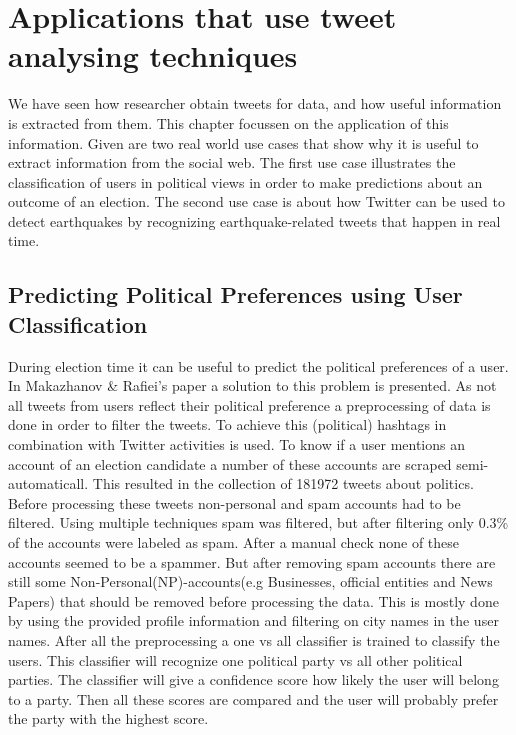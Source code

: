 \documentclass{article}
\begin{document}
\section{Applications that use tweet analysing techniques}

We have seen how researcher obtain tweets for data, and how useful information is extracted from them. This chapter focussen on the application of this information.
Given are two real world use cases that show why it is useful to extract information from the social web. The first use case illustrates the classification
of users in political views in order to make predictions about an outcome of an election. The second use case is about how Twitter can be used to detect
earthquakes by recognizing earthquake-related tweets that happen in real time.

\subsection*{Predicting Political Preferences using User Classification}

During election time it can be useful to predict the political preferences of a user. In Makazhanov \& Raﬁei's paper a solution to this problem is presented. 
As not all tweets from users reflect their political preference a preprocessing of data is done in order to filter the tweets. \cite{pol} To achieve this 
(political) hashtags in combination with Twitter activities is used. To know if a user mentions an account of an election candidate a number of these 
accounts are scraped semi-automaticall. This resulted in the collection of 181972 tweets about politics.\cite{pol}
Before processing these tweets non-personal and spam accounts had to be filtered. Using multiple techniques spam was filtered, but after filtering 
only 0.3\% of the accounts were labeled as spam. After a manual check none of these accounts seemed to be a spammer. But after removing spam accounts 
there are still some Non-Personal(NP)-accounts(e.g Businesses, official entities and News Papers)  that should be removed before processing the data. 
This is mostly done by using the provided profile information and filtering on city names in the user names.  \cite{pol}
After all the preprocessing a one vs all classifier is trained to classify the users. This classifier will recognize one political party vs all other 
political parties. The classifier will give a confidence score how likely the user will belong to a party. Then all these scores are compared and the user 
will probably prefer the party with the highest score.  \cite{pol}
\end{document}
